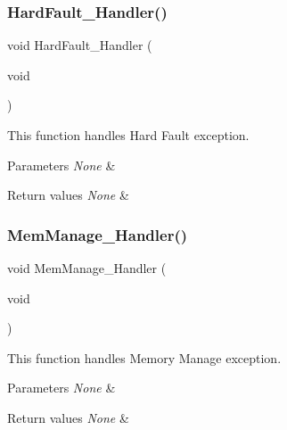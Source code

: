 \subsubsection{\texorpdfstring{Hard\+Fault\+\_\+\+Handler()}{HardFault\_Handler()}}
{\footnotesize\ttfamily void Hard\+Fault\+\_\+\+Handler (\begin{DoxyParamCaption}\item[{void}]{ }\end{DoxyParamCaption})}



This function handles Hard Fault exception. 


\begin{DoxyParams}{Parameters}
{\em None} & \\
\hline
\end{DoxyParams}

\begin{DoxyRetVals}{Return values}
{\em None} & \\
\hline
\end{DoxyRetVals}
\mbox{\label{group___templates_ga3150f74512510287a942624aa9b44cc5}} 
\subsubsection{\texorpdfstring{Mem\+Manage\+\_\+\+Handler()}{MemManage\_Handler()}}
{\footnotesize\ttfamily void Mem\+Manage\+\_\+\+Handler (\begin{DoxyParamCaption}\item[{void}]{ }\end{DoxyParamCaption})}



This function handles Memory Manage exception. 


\begin{DoxyParams}{Parameters}
{\em None} & \\
\hline
\end{DoxyParams}

\begin{DoxyRetVals}{Return values}
{\em None} & \\
\hline
\end{DoxyRetVals}
\mbox{\label{group___templates_ga6ad7a5e3ee69cb6db6a6b9111ba898bc}} 
